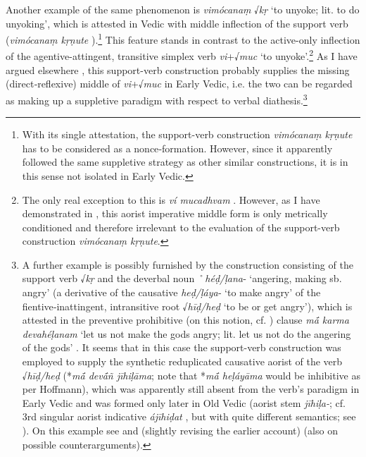 \documentclass[output=paper,colorlinks,citecolor=brown]{langscibook}
\begin{document}
\largerpage[-1]
Another example of the same phenomenon is \textit{vimócanaṃ} √\textit{kṛ} ‘to unyoke; lit. to do unyoking’, which is attested in Vedic with middle inflection of the support verb (\textit{vimócanaṃ kṛṇute} ).\footnote{With its single attestation, the support-verb construction \textit{vimócanaṃ kṛṇute} has to be considered as a nonce‑formation. However, since it apparently followed the same suppletive strategy as other similar constructions, it is in this sense not isolated in Early Vedic.}  This feature stands in contrast to the active-only inflection of the agentive-attingent, transitive simplex verb \textit{vi}+√\textit{muc} ‘to unyoke’.\footnote{The only real exception to this is \textit{ví mucadhvam} . However, as I have demonstrated in \citet[114--116]{Ittzés2013}, this aorist imperative middle form is only metrically conditioned and therefore irrelevant to the evaluation of the support-verb construction \textit{vimócanaṃ kṛṇute}.}      As I have argued elsewhere \citep{Ittzés2013}, this support-verb construction probably supplies the missing (direct‑reflexive) middle of \textit{vi}+√\textit{muc} in Early Vedic, i.e. the two can be regarded as making up a suppletive paradigm with respect to verbal diathesis.\footnote{A further example is possibly furnished by the construction consisting of the support verb √\textit{kṛ} and the deverbal noun ˚\textit{héḍ/ḷana}‑ ‘angering, making sb. angry’ (a derivative of the causative \textit{heḍ/ḷáya}‑ ‘to make angry’ of the fientive‑inattingent, intransitive root √\textit{hīḍ/heḍ} ‘to be or get angry’), which is attested in the preventive prohibitive (on this notion, cf. \citealt{Hoffmann1967}) clause \textit{mā́ karma devahéḷanam} ‘let us not make the gods angry; lit. let us not do the angering of the gods’ . It seems that in this case the support-verb construction was employed to supply the synthetic reduplicated causative aorist of the verb √\textit{hīḍ/heḍ} (*\textit{mā́ devā́ñ jīhiḷāma}; note that *\textit{mā́ heḷáyāma} would be inhibitive as per Hoffmann), which was apparently still absent from the verb’s paradigm in Early Vedic and was formed only later in Old Vedic (aorist stem \textit{jīhiḷa-}; cf. 3rd singular aorist indicative \textit{ájīhiḍat} , but with quite different semantics; see \citealt[351 n. 866]{Gotō1987}). On this example see \citet[343--345]{Ittzés2015} and (slightly revising the earlier account) \citet[108--111]{Ittzés2016} (also on possible counterarguments).}
\end{document}
